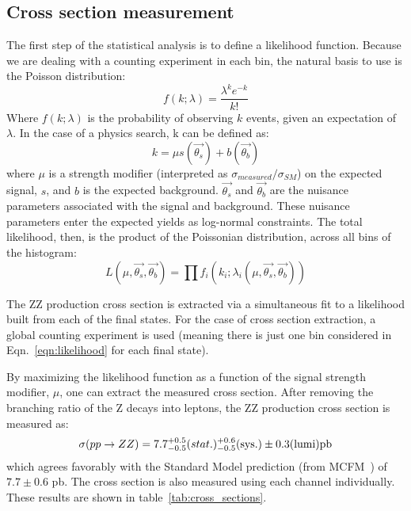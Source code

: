 \subsection{Cross section measurement} 
The first step of the statistical analysis is to define a likelihood function.
Because we are dealing with a counting experiment in each bin, the natural basis
to use is the Poisson distribution:
\begin{equation}
    f(k; \lambda) =\frac{\lambda^k e^{-k}}{k!} 
\end{equation}
Where $f(k; \lambda)$ is the probability of observing $k$ events, given an
expectation of $\lambda$. In the case of a physics search, k can be defined as:
\begin{equation}
    k = \mu s(\vec{\theta_s}) + b(\vec{\theta_b})
\end{equation}
where $\mu$ is a strength modifier (interpreted as
$\sigma_{measured}/\sigma_{SM}$) on the expected signal, $s$, and $b$ is the
expected background. $\vec{\theta_s}$ and $\vec{\theta_b}$ are the
nuisance parameters associated with the signal and background. These nuisance
parameters enter the expected yields as log-normal constraints.  The total
likelihood, then, is the product of the Poissonian distribution, across all bins
of the histogram:
\begin{equation}
    \label{eqn:likelihood}
    L(\mu, \vec{\theta_s}, \vec{\theta_b}) = \prod f_i(k_i; \lambda_i (\mu,
    \vec{\theta_s}, \vec{\theta_b}))
\end{equation}

The ZZ production cross section is extracted via a simultaneous fit to a likelihood
built from each of the final states. For the case of cross section extraction, a
global counting experiment is used (meaning there is just one bin considered in
Eqn.~\ref{eqn:likelihood} for each final state). 

By maximizing the likelihood function as a function of the signal strength
modifier, $\mu$, one can extract the measured cross section. After removing the
branching ratio of the Z decays into leptons, the ZZ production cross section is
measured as:
\begin{equation}
    \sigma(pp\rightarrow ZZ) = 7.7^{+0.5}_{-0.5} \textrm(stat.) ^{+0.6}_{-0.5}
    \textrm{(sys.)}  \pm 0.3 \textrm{(lumi)} \textrm{pb}
\end{equation}
which agrees favorably with the Standard Model prediction (from MCFM~\cite{MCFM})
of $7.7 \pm 0.6$ pb.
The cross section is also measured using each channel individually. These
results are shown in table~\ref{tab:cross_sections}.

